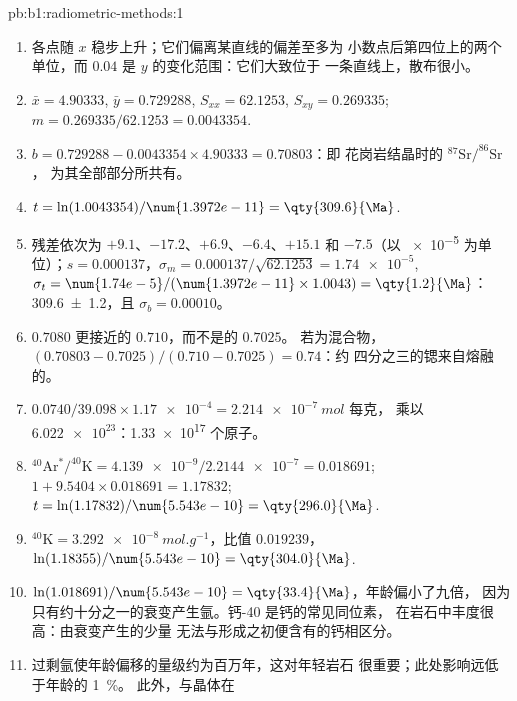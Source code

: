 \begin{solution}{pb:b1:radiometric-methods:1}
\begin{enumerate}
  \item 各点随 $x$ 稳步上升；它们偏离某直线的偏差至多为
        小数点后第四位上的两个单位，而 $0.04$ 是 $y$ 的变化范围：它们大致位于
        一条直线上，散布很小。
  \item $\bar x = 4.90333$, $\bar y = 0.729288$, $S_{xx} = 62.1253$, $S_{xy} =
        0.269335$; $m = 0.269335/62.1253 = 0.0043354$.
  \item $b = 0.729288 - 0.0043354 \times 4.90333 = 0.70803$：即
        花岗岩结晶时的 $^{87}\mathrm{Sr}/^{86}\mathrm{Sr}$，
        为其全部部分所共有。
  \item $t = \ln(1.0043354)/\num{1.3972e-11} = \qty{309.6}{\Ma}$.
  \item 残差依次为 $+9.1$、$-17.2$、$+6.9$、$-6.4$、$+15.1$ 和 $-7.5$（以
        \num{e-5} 为单位）；$s = 0.000137$，$\sigma_m = 0.000137/\sqrt{62.1253} =
        \num{1.74e-5}$, $\sigma_t = \num{1.74e-5}/(\num{1.3972e-11} \times 1.0043)
        = \qty{1.2}{\Ma}$：\qty[uncertainty-mode=separate]{309.6(12)}{\Ma}，且
        $\sigma_b = 0.00010$。
  \item $0.7080$ 更接近的 $0.710$，而不是的 $0.7025$。
        若为混合物，$(0.70803 - 0.7025)/(0.710 - 0.7025) = 0.74$：约
        四分之三的锶来自熔融的。
  \item $0.0740/39.098 \times \num{1.17e-4} = \qty{2.214e-7}{mol}$ 每克，
        乘以 $\num{6.022e23}$：\num{1.33e17} 个原子。
  \item $^{40}\mathrm{Ar}^*/^{40}\mathrm{K} = \num{4.139e-9}/\num{2.2144e-7} =
        0.018691$; $1 + 9.5404 \times 0.018691 = 1.17832$; $t =
        \ln(1.17832)/\num{5.543e-10} = \qty{296.0}{\Ma}$.
  \item $^{40}\mathrm{K} = \qty{3.292e-8}{mol.g^{-1}}$，比值 $0.019239$，
        $\ln(1.18355)/\num{5.543e-10} = \qty{304.0}{\Ma}$.
  \item $\ln(1.018691)/\num{5.543e-10} = \qty{33.4}{\Ma}$，年龄偏小了九倍，
        因为只有约十分之一的衰变产生氩。钙-40 是钙的常见同位素，
        在岩石中丰度很高：由衰变产生的少量
        无法与形成之初便含有的钙相区分。
  \item 过剩氩使年龄偏移的量级约为百万年，这对年轻岩石
        很重要；此处影响远低于年龄的 \qty{1}{\percent}。
        此外，与晶体在

\end{enumerate}
\end{solution}
